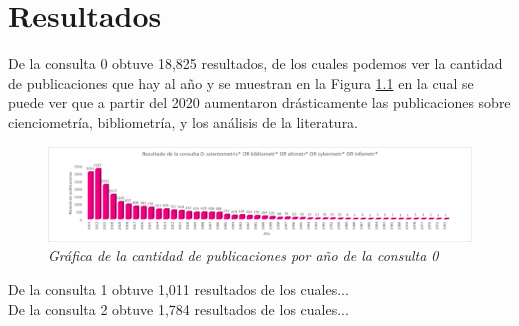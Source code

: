 \chapter{Resultados}

De la consulta 0 obtuve 18,825 resultados, de los cuales podemos ver la cantidad de publicaciones que hay al año y se muestran en la Figura \ref{fig:consulta0} en la cual se puede ver que a partir del 2020 aumentaron drásticamente las publicaciones sobre cienciometría, bibliometría, y los análisis de la literatura. 
\begin{figure}[H]
\centering
\includegraphics[width=1\textwidth]{Imagenes/consulta0.png}
\caption{\textit{Gráfica de la cantidad de publicaciones por año de la consulta 0}}
\label{fig:consulta0}
\end{figure}
De la consulta 1 obtuve 1,011 resultados de los cuales...\\
De la consulta 2 obtuve 1,784 resultados de los cuales...\\